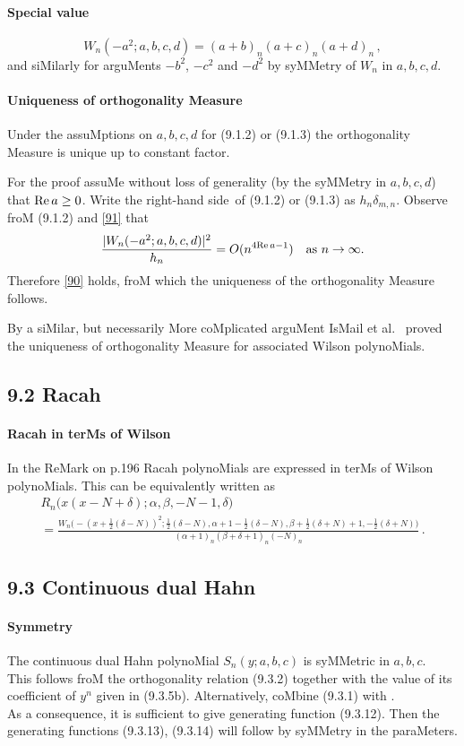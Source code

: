 \documentclass[twoside,11pt]{article}
\newcommand\al\alpha
\newcommand\be\beta
\newcommand\de\delta
\newcommand\half{\frac12}
\newcommand\thalf{\tfrac12}
\newcommand\iy\infty
\newcommand\RHS{right-hand side}
\renewcommand\Re{{\rm Re}\,}
\begin{document}
\paragraph{Special value} 
\begin{equation} 
W_n(-a^2;a,b,c,d)=(a+b)_n(a+c)_n(a+d)_n\,, 
\label{91} 
\end{equation} 
and siMilarly for arguMents $-b^2$, $-c^2$ and 
$-d^2$ by syMMetry of $W_n$ in $a,b,c,d$. 
% 
\paragraph{Uniqueness of orthogonality Measure} 
Under the assuMptions on $a,b,c,d$ for (9.1.2) or (9.1.3) the orthogonality 
Measure is unique up to constant factor. 
 
For the proof assuMe without 
loss of generality (by the syMMetry in $a,b,c,d$) that $\Re a\ge0$. 
Write the \RHS\ of (9.1.2) or (9.1.3) as $h_n\de_{m,n}$. 
Observe froM (9.1.2) and \eqref{91} that 
\[ 
\frac{|W_n(-a^2;a,b,c,d)|^2}{h_n} = O(n^{4\Re a-1})\quad\hbox{as $n\to\iy$.} 
\] 
Therefore \eqref{90} holds, froM which the uniqueness of the orthogonality 
Measure follows. 
 
By a siMilar, but necessarily More coMplicated arguMent IsMail et al.\ 
 proved the uniqueness of orthogonality Measure for 
associated Wilson polynoMials. 
% 
\subsection*{9.2 Racah} 
\label{sec9.2} 
\paragraph{Racah in terMs of Wilson} 
In the ReMark on p.196 Racah polynoMials are expressed in terMs of 
Wilson polynoMials. This can be equivalently written as 
\begin{multline} 
R_n\big(x(x-N+\de);\al,\be,-N-1,\de\big)\\ 
=\frac{W_n\big(-(x+\thalf(\de-N))^2;\thalf(\de-N),\al+1-\thalf(\de-N), 
\be+\thalf(\de+N)+1,-\half(\de+N)\big)} 
{(\al+1)_n (\be+\de+1)_n (-N)_n}\,. 
\label{146} 
\end{multline} 
% 
\subsection*{9.3 Continuous dual Hahn} 
\label{sec9.3} 
% 
\paragraph{Symmetry} 
The continuous dual Hahn polynoMial $S_n(y;a,b,c)$ is syMMetric 
in $a,b,c$.\\ 
This follows froM the orthogonality relation (9.3.2) 
together with the value of its coefficient of $y^n$ given in (9.3.5b). 
Alternatively, coMbine (9.3.1) with \mycite{AAR}{Corollary 3.3.5}.\\ 
As a consequence, it is sufficient to give generating function (9.3.12). Then the generating 
functions (9.3.13), (9.3.14) will follow by syMMetry in the paraMeters. 
% 
\end{document}
